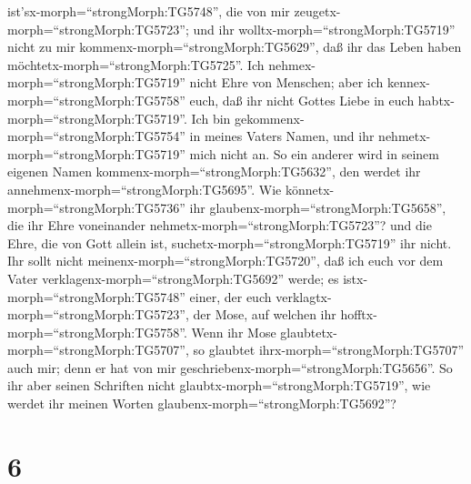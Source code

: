 ist'sx-morph=``strongMorph:TG5748'', die von mir
zeugetx-morph=``strongMorph:TG5723'';  und ihr
wolltx-morph=``strongMorph:TG5719'' nicht zu mir
kommenx-morph=``strongMorph:TG5629'', daß ihr das Leben haben
möchtetx-morph=``strongMorph:TG5725''.  Ich
nehmex-morph=``strongMorph:TG5719'' nicht Ehre von Menschen;
 aber ich kennex-morph=``strongMorph:TG5758'' euch, daß ihr
nicht Gottes Liebe in euch habtx-morph=``strongMorph:TG5719''.
 Ich bin gekommenx-morph=``strongMorph:TG5754'' in meines
Vaters Namen, und ihr nehmetx-morph=``strongMorph:TG5719'' mich nicht
an. So ein anderer wird in seinem eigenen Namen
kommenx-morph=``strongMorph:TG5632'', den werdet ihr
annehmenx-morph=``strongMorph:TG5695''.  Wie
könnetx-morph=``strongMorph:TG5736'' ihr
glaubenx-morph=``strongMorph:TG5658'', die ihr Ehre voneinander
nehmetx-morph=``strongMorph:TG5723''? und die Ehre, die von Gott allein
ist, suchetx-morph=``strongMorph:TG5719'' ihr nicht.  Ihr
sollt nicht meinenx-morph=``strongMorph:TG5720'', daß ich euch vor dem
Vater verklagenx-morph=``strongMorph:TG5692'' werde; es
istx-morph=``strongMorph:TG5748'' einer, der euch
verklagtx-morph=``strongMorph:TG5723'', der Mose, auf welchen ihr
hofftx-morph=``strongMorph:TG5758''.  Wenn ihr Mose
glaubtetx-morph=``strongMorph:TG5707'', so glaubtet
ihrx-morph=``strongMorph:TG5707'' auch mir; denn er hat von mir
geschriebenx-morph=``strongMorph:TG5656''.  So ihr aber
seinen Schriften nicht glaubtx-morph=``strongMorph:TG5719'', wie werdet
ihr meinen Worten glaubenx-morph=``strongMorph:TG5692''?

\hypertarget{section-5}{%
\section{6}\label{section-5}}

